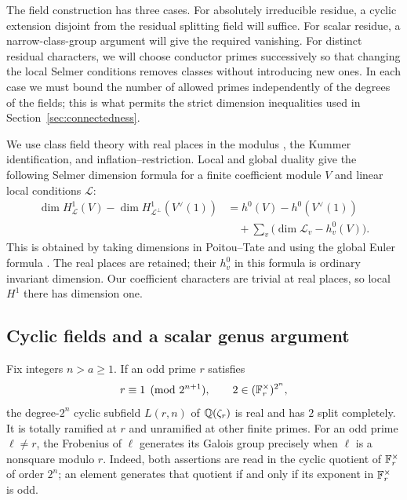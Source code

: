 The field construction has three cases.  For absolutely irreducible
residue, a cyclic extension disjoint from the residual splitting field
will suffice.  For scalar residue, a narrow-class-group argument will
give the required vanishing.  For distinct residual characters, we will
choose conductor primes successively so that changing the local Selmer
conditions removes classes without introducing new ones.  In each case
we must bound the number of allowed primes independently of the degrees
of the fields; this is what permits the strict dimension inequalities
used in Section~\ref{sec:connectedness}.

We use class field theory with real places in the modulus
\cite[Chapter~V, Theorems~1.7, 3.5, and~3.6]{MilneCFT}, the Kummer
identification, and inflation--restriction.  Local and global duality
give the following Selmer dimension formula for a finite coefficient
module $V$ and linear local conditions $\mathcal L$:
\begin{equation}\label{eq:field-selmer-formula}
 \begin{aligned}
 \dim H^1_{\mathcal L}(V)-\dim H^1_{\mathcal L^\perp}(V^\vee(1))
 &=h^0(V)-h^0(V^\vee(1))\\
 &\quad+\sum_v\bigl(\dim\mathcal L_v-h^0_v(V)\bigr).
 \end{aligned}
\end{equation}
This is obtained by taking dimensions in Poitou--Tate and using the
global Euler formula
\cite[Chapter~I, Theorems~4.10 and~5.1, Remark~5.2(a)]{Milne2006}.
The real places are retained; their $h^0_v$ in this formula is ordinary
invariant dimension.  Our coefficient characters are trivial at real
places, so local $H^1$ there has dimension one.

\subsection{Cyclic fields and a scalar genus argument}

Fix integers $n>a\ge1$.  If an odd prime $r$ satisfies
\begin{equation}\label{eq:conductor-power}
 r\equiv1\pmod{2^{n+1}},\qquad
               2\in(\mathbb F_r^\times)^{2^n},
\end{equation}
the degree-$2^n$ cyclic subfield $L(r,n)$ of $\mathbb Q(\zeta_r)$ is real
and has $2$ split completely.  It is totally ramified at $r$ and
unramified at other finite primes.  For an odd prime $\ell\ne r$,
the Frobenius of $\ell$ generates its Galois group precisely when
$\ell$ is a nonsquare modulo $r$.  Indeed, both assertions are read
in the cyclic quotient of $\mathbb F_r^\times$ of order $2^n$; an element
generates that quotient if and only if its exponent in
$\mathbb F_r^\times$ is odd.

